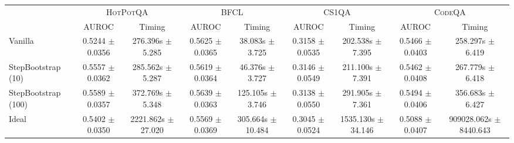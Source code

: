 \begin{table}[t]
\begin{tabular}{lcccccccc}
    \end{tabular}
    \vspace{5pt}
    \begin{tabular}{lcccccccc}
        \multirow{2}{*}{} & \multicolumn{2}{c}{\textsc{HotPotQA}} & \multicolumn{2}{c}{\textsc{BFCL}} & \multicolumn{2}{c}{\textsc{CS1QA}} & \multicolumn{2}{c}{\textsc{CodeQA}} \\
        \cmidrule(lr){2-3} \cmidrule(lr){4-5} \cmidrule(lr){6-7} \cmidrule(lr){8-9}
          & AUROC & Timing & AUROC & Timing & AUROC & Timing & AUROC & Timing \\
        \cmidrule(lr){2-3} \cmidrule(lr){4-5} \cmidrule(lr){6-7} \cmidrule(lr){8-9}
        Vanilla & 0.5244 $\pm$ 0.0356 & 276.396s $\pm$ 5.285 & 0.5625 $\pm$ 0.0365 & 38.083s $\pm$ 3.725 & 0.3158 $\pm$ 0.0535 & 202.538s $\pm$ 7.395 & 0.5466 $\pm$ 0.0403 & 258.297s $\pm$ 6.419 \\
        StepBootstrap (10) & 0.5557 $\pm$ 0.0362 & 285.562s $\pm$ 5.287 & 0.5619 $\pm$ 0.0364 & 46.376s $\pm$ 3.727 & 0.3146 $\pm$ 0.0549 & 211.100s $\pm$ 7.391 & 0.5462 $\pm$ 0.0408 & 267.779s $\pm$ 6.418 \\
        StepBootstrap (100) & 0.5589 $\pm$ 0.0357 & 372.769s $\pm$ 5.348 & 0.5639 $\pm$ 0.0363 & 125.105s $\pm$ 3.746 & 0.3138 $\pm$ 0.0550 & 291.905s $\pm$ 7.361 & 0.5494 $\pm$ 0.0406 & 356.683s $\pm$ 6.427 \\
        Ideal & 0.5402 $\pm$ 0.0350 & 2221.862s $\pm$ 27.020 & 0.5569 $\pm$ 0.0369 & 305.664s $\pm$ 10.484 & 0.3045 $\pm$ 0.0524 & 1535.130s $\pm$ 34.146 & 0.5088 $\pm$ 0.0407 & 909028.062s $\pm$ 8440.643 \\
        \bottomrule
    \end{tabular}
\end{table}